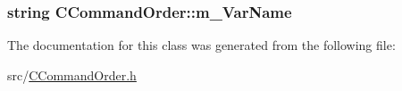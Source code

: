 \subsubsection[{\texorpdfstring{m\+\_\+\+Var\+Name}{m_VarName}}]{\setlength{\rightskip}{0pt plus 5cm}string C\+Command\+Order\+::m\+\_\+\+Var\+Name\hspace{0.3cm}{\ttfamily [private]}}\hypertarget{classCCommandOrder_a45fb2d9961cefa2347113dc870bec8fb}{}\label{classCCommandOrder_a45fb2d9961cefa2347113dc870bec8fb}


The documentation for this class was generated from the following file\+:\begin{DoxyCompactItemize}
\item 
src/\hyperlink{CCommandOrder_8h}{C\+Command\+Order.\+h}\end{DoxyCompactItemize}
